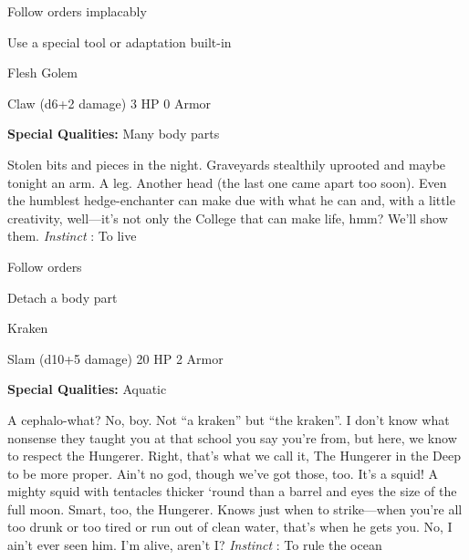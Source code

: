 \startitemize[1,packed]

\item Follow orders implacably

 
\item Use a special tool or adaptation built-in


\stopitemize
 
\startMonsterName
Flesh Golem	 
\stopMonsterName
 

Claw (d6+2 damage)	3 HP	0 Armor

 


 
\startMonsterQualities
{\bf Special Qualities:}  Many body parts
\stopMonsterQualities
 
\startMonsterDescription
Stolen bits and pieces in the night. Graveyards stealthily uprooted and maybe tonight an arm. A leg. Another head (the last one came apart too soon). Even the humblest hedge-enchanter can make due with what he can and, with a little creativity, well—it’s not only the College that can make life, hmm? We’ll show them. {\em Instinct} : To live
\stopMonsterDescription
 
\startitemize[1,packed]

\item Follow orders

 
\item Detach a body part


\stopitemize
 
\startMonsterName
Kraken	 
\stopMonsterName
 

Slam (d10+5 damage)	20 HP	2 Armor

 


 
\startMonsterQualities
{\bf Special Qualities:}  Aquatic
\stopMonsterQualities
 
\startMonsterDescription
A cephalo-what? No, boy. Not “a kraken” but “the kraken”. I don’t know what nonsense they taught you at that school you say you’re from, but here, we know to respect the Hungerer. Right, that’s what we call it, The Hungerer in the Deep to be more proper. Ain’t no god, though we’ve got those, too. It’s a squid! A mighty squid with tentacles thicker ‘round than a barrel and eyes the size of the full moon. Smart, too, the Hungerer. Knows just when to strike—when you’re all too drunk or too tired or run out of clean water, that’s when he gets you. No, I ain’t ever seen him. I’m alive, aren’t I? {\em Instinct} : To rule the ocean
\stopMonsterDescription
 
